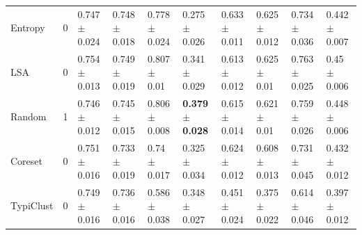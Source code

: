 \documentclass[]{article}
\begin{document}
\begin{table}[H]
{\begin{tabular}{l|lllllllll}
			Entropy & 0 & 0.747 $\pm$ {\small 0.024} & 0.748 $\pm$ {\small 0.018} & 0.778 $\pm$ {\small 0.024} & 0.275 $\pm$ {\small 0.026} & 0.633 $\pm$ {\small 0.011} & 0.625 $\pm$ {\small 0.012} & 0.734 $\pm$ {\small 0.036} & 0.442 $\pm$ {\small 0.007} \\
			
			LSA & 0 & 0.754 $\pm$ {\small 0.013} & 0.749 $\pm$ {\small 0.019} & 0.807 $\pm$ {\small 0.01} & 0.341 $\pm$ {\small 0.029} & 0.613 $\pm$ {\small 0.012} & 0.625 $\pm$ {\small 0.01} & 0.763 $\pm$ {\small 0.025} & 0.45 $\pm$ {\small 0.006} \\
			
			Random & 1 & 0.746 $\pm$ {\small 0.012} & 0.745 $\pm$ {\small 0.015} & 0.806 $\pm$ {\small 0.008} & \textbf{0.379 $\pm$ {\small 0.028}} & 0.615 $\pm$ {\small 0.014} & 0.621 $\pm$ {\small 0.01} & 0.759 $\pm$ {\small 0.026} & 0.448 $\pm$ {\small 0.006} \\
			
			Coreset & 0 & 0.751 $\pm$ {\small 0.016} & 0.733 $\pm$ {\small 0.019} & 0.74 $\pm$ {\small 0.017} & 0.325 $\pm$ {\small 0.034} & 0.624 $\pm$ {\small 0.012} & 0.608 $\pm$ {\small 0.013} & 0.731 $\pm$ {\small 0.045} & 0.432 $\pm$ {\small 0.012} \\
			
			TypiClust & 0 & 0.749 $\pm$ {\small 0.016} & 0.736 $\pm$ {\small 0.016} & 0.586 $\pm$ {\small 0.038} & 0.348 $\pm$ {\small 0.027} & 0.451 $\pm$ {\small 0.024} & 0.375 $\pm$ {\small 0.022} & 0.614 $\pm$ {\small 0.046} & 0.397 $\pm$ {\small 0.012} \\
		\end{tabular}
	}
\end{table}
\end{document}
